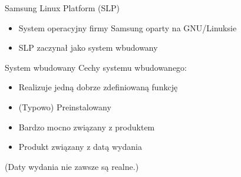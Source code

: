 \documentclass[presentation,aspectratio=43,12pt]{beamer}
\begin{document}
\begin{frame}[label=sec-4-1]{Samsung Linux Platform (SLP)}
\begin{itemize}
\item System operacyjny firmy Samsung oparty na GNU/Linuksie

\item SLP zaczynał jako system wbudowany
\end{itemize}

\end{frame}
\begin{frame}[label=sec-4-2]{System wbudowany}
Cechy systemu wbudowanego:

\begin{itemize}
\item Realizuje jedną dobrze zdefiniowaną funkcję
\item (Typowo) Preinstalowany
\item <2-> Bardzo mocno związany z produktem
\item <2-> Produkt związany z datą wydania
\end{itemize}

\pause\vskip1cm

(Daty wydania nie zawsze są realne.)

\end{frame}
\end{document}
